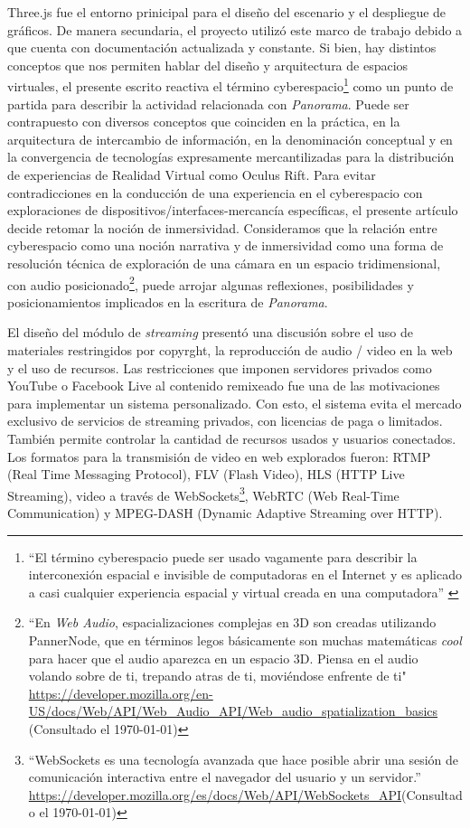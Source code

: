 Three.js fue el entorno prinicipal para el diseño del escenario y el despliegue de gráficos. De manera secundaria, el proyecto utilizó este marco de trabajo debido a que cuenta con documentación actualizada y constante. Si bien, hay distintos conceptos que nos permiten hablar del diseño y arquitectura de espacios virtuales, el presente escrito reactiva el término cyberespacio\footnote{``El término cyberespacio puede ser usado vagamente para describir la interconexión espacial e invisible de computadoras en el Internet y es aplicado a casi cualquier experiencia espacial y virtual creada en una computadora'' \citep{cyberspace}} como un punto de partida para describir la actividad relacionada con \textit{Panorama}. Puede ser contrapuesto con diversos conceptos que coinciden en la práctica, en la arquitectura de intercambio de información, en la denominación conceptual y en la convergencia de tecnologías expresamente mercantilizadas para la distribución de experiencias de Realidad Virtual como Oculus Rift. Para evitar contradicciones en la conducción de una experiencia en el cyberespacio con exploraciones de dispositivos/interfaces-mercancía específicas, el presente artículo decide retomar la noción de inmersividad. Consideramos que la relación entre cyberespacio como una noción narrativa y de inmersividad como una forma de resolución técnica de exploración de una cámara en un espacio tridimensional, con audio posicionado\footnote{``En \textit{Web Audio}, espacializaciones complejas en 3D son creadas utilizando PannerNode, que en términos legos básicamente son muchas matemáticas \textit{cool} para hacer que el audio aparezca en un espacio 3D. Piensa en el audio volando sobre de ti, trepando atras de ti, moviéndose enfrente de ti" \url{https://developer.mozilla.org/en-US/docs/Web/API/Web_Audio_API/Web_audio_spatialization_basics} (Consultado el \today)}, puede arrojar algunas reflexiones, posibilidades y posicionamientos implicados en la escritura de \textit{Panorama}. %
\color{black}

El diseño del módulo de \textit{streaming} presentó una discusión sobre el uso de materiales restringidos por copyrght, la reproducción de audio / video en la web y el uso de recursos. Las restricciones que imponen servidores privados como YouTube o Facebook Live al contenido remixeado fue una de las motivaciones para implementar un sistema personalizado. Con esto, el sistema evita el mercado exclusivo de servicios de streaming privados, con licencias de paga o limitados. También permite controlar la cantidad de recursos usados y usuarios conectados. Los formatos para la transmisión de video en web explorados fueron: RTMP (Real Time Messaging Protocol), FLV (Flash Video), HLS (HTTP Live Streaming), video a través de WebSockets\footnote{``WebSockets es una tecnología avanzada que hace posible abrir una sesión de comunicación interactiva entre el navegador del usuario y un servidor.'' \url{https://developer.mozilla.org/es/docs/Web/API/WebSockets_API}(Consultado el \today)}, WebRTC (Web Real-Time Communication) y MPEG-DASH (Dynamic Adaptive Streaming over HTTP).

